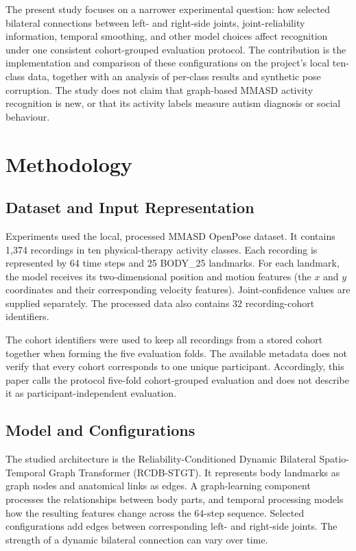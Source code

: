 The present study focuses on a narrower experimental question: how selected bilateral connections between left- and right-side joints, joint-reliability information, temporal smoothing, and other model choices affect recognition under one consistent cohort-grouped evaluation protocol. The contribution is the implementation and comparison of these configurations on the project's local ten-class data, together with an analysis of per-class results and synthetic pose corruption. The study does not claim that graph-based MMASD activity recognition is new, or that its activity labels measure autism diagnosis or social behaviour.

\section{Methodology}\label{sec:methodology}

\subsection{Dataset and Input Representation}

Experiments used the local, processed MMASD OpenPose dataset. It contains 1,374 recordings in ten physical-therapy activity classes. Each recording is represented by 64 time steps and 25 BODY\_25 landmarks. For each landmark, the model receives its two-dimensional position and motion features (the $x$ and $y$ coordinates and their corresponding velocity features). Joint-confidence values are supplied separately. The processed data also contains 32 recording-cohort identifiers.

The cohort identifiers were used to keep all recordings from a stored cohort together when forming the five evaluation folds. The available metadata does not verify that every cohort corresponds to one unique participant. Accordingly, this paper calls the protocol five-fold cohort-grouped evaluation and does not describe it as participant-independent evaluation.

\subsection{Model and Configurations}

The studied architecture is the Reliability-Conditioned Dynamic Bilateral Spatio-Temporal Graph Transformer (RCDB-STGT). It represents body landmarks as graph nodes and anatomical links as edges. A graph-learning component processes the relationships between body parts, and temporal processing models how the resulting features change across the 64-step sequence. Selected configurations add edges between corresponding left- and right-side joints. The strength of a dynamic bilateral connection can vary over time.


